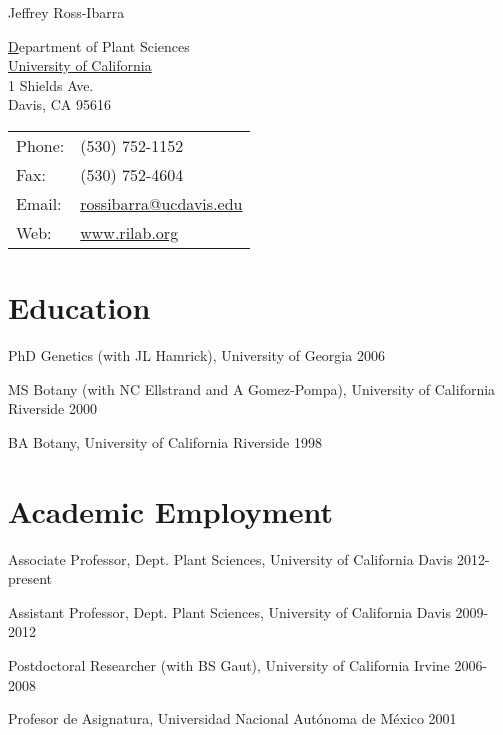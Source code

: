 \documentclass[letterpaper]{article}
\def\name{Jeffrey Ross-Ibarra}
\renewenvironment{itemize}{
  \begin{list}{}{
    \setlength{\leftmargin}{1.5em}
  }
}{
  \end{list}
}
\begin{document}
{\huge \name}


\vspace{0.25in}

\begin{minipage}{0.55\linewidth}
  \href{http://www.plantsciences.ucdavis.edu/plantsciences/}Department of Plant Sciences\\
  \href{http://www.ucdavis.edu/}{University of California} \\
  1 Shields Ave.\\
  Davis, CA 95616
\end{minipage}
\begin{minipage}{0.35\linewidth}
  \begin{tabular}{ll}
    Phone: & (530) 752-1152 \\
    Fax: &  (530) 752-4604 \\
    Email: & \href{mailto:rossibarra@ucdavis.edu}{rossibarra@ucdavis.edu} \\
    Web: & \href{http://www.rilab.org/}{www.rilab.org} \\
  \end{tabular}
\end{minipage}

\section*{Education}
\begin{itemize}
 \item PhD Genetics (with JL Hamrick), University of Georgia 2006
  \item MS Botany (with NC Ellstrand and A Gomez-Pompa), University of California Riverside 2000 
 \item BA Botany, University of California Riverside 1998 
\end{itemize}

\section*{Academic Employment}
\begin{itemize}
\item Associate Professor, Dept. Plant Sciences, University of California Davis 2012-present
\item Assistant Professor, Dept. Plant Sciences, University of California Davis 2009-2012
\item Postdoctoral Researcher (with BS Gaut), University of California Irvine 2006-2008
\item Profesor de Asignatura, Universidad Nacional Aut\'{o}noma de M\'{e}xico 2001
\end{itemize}
\end{document}
